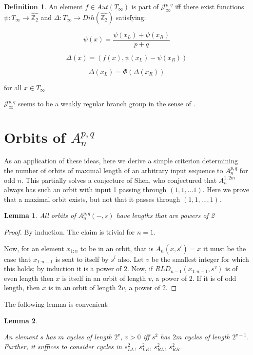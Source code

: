 \documentclass[11pt]{article}
\theoremstyle{plain}
\newtheorem{lemma}{Lemma}
\theoremstyle{definition}
\newtheorem{definition}{Definition}
\begin{document}
\pagebreak

\begin{definition}
An element $f \in Aut(T_\infty)$ is part of $\mathcal{J}_\infty^{p,q}$ iff there exist functions $\psi:T_\infty \rightarrow \widehat{\mathbb{Z}_2}$ and $\Delta: T_\infty \rightarrow Dih(\widehat{\mathbb{Z}_2})$ satisfying:

$$\psi(x) = \frac{\psi(x_L) + \psi(x_R)}{p+q}$$

$$\Delta(x) = (f(x), \psi(x_L) - \psi(x_R))$$

$$\Delta(x_L) = \Phi(\Delta(x_R))$$

for all $x \in T_\infty$

\end{definition}

$\mathcal{J}_\infty^{p,q}$ seems to be a weakly regular branch group in the sense of \cite{branch}.


\section{Orbits of $A_n^{p,q}$}

As an application of these ideas, here we derive a simple criterion determining the number of orbits of maximal length of an arbitrary input sequence to $A_n^{p,q}$ for odd $n$. This partially solves a conjecture of Shen\cite{shen}, who conjectured that $A_n^{1,2m}$ always has such an orbit with input 1 passing through $(1, 1, ...1)$. Here we prove that a maximal orbit exists, but not that it passes through $(1, 1,...,1)$.

\begin{lemma}
    All orbits of $A_n^{p,q}(-,s)$ have lengths that are powers of 2
\end{lemma}
\begin{proof}
By induction. The claim is trivial for $n=1$.

Now, for an element $x_{1:n}$ to be in an orbit, that is $A_n(x, s^l) = x$ it must be the case that $x_{1:n-1}$ is sent to itself by $s^l$ also. Let $v$ be the smallest integer for which this holds; by induction it is a power of 2. Now, if $RLD_{n-1}(x_{1:n-1}, s^v)$ is of even length then $x$ is itself in an orbit of length $v$, a power of 2. If it is of odd length, then $x$ is in an orbit of length $2v$, a power of 2.


\end{proof}

The following lemma is convenient:


\begin{lemma}\label{obvious}

An element $s$ has $m$ cycles of length $2^v$, $v>0$ iff $s^2$ has $2m$ cycles of length $2^{v-1}$. Further, it suffices to consider cycles in $s^2_{LL}$, $s^2_{LR}$, $s^2_{RL}$, $s^2_{RR}$.
        
\end{lemma}
\end{document}
